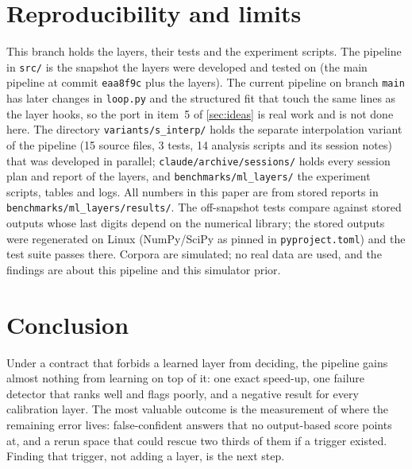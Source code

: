 \section{Reproducibility and limits}\label{sec:repro}
This branch holds the layers, their tests and the experiment scripts. The pipeline in \texttt{src/} is the snapshot the layers were developed and tested on (the main pipeline at commit \texttt{eaa8f9c} plus the layers). The current pipeline
on branch \texttt{main} has later changes in \texttt{loop.py} and the structured fit that touch the same lines as the layer hooks, so the port in item~5 of \cref{sec:ideas} is real work and is not done here. The directory \texttt{variants/s\_interp/} holds the separate interpolation variant of the pipeline (15 source files, 3 tests, 14 analysis scripts and its session notes) that was developed in parallel; \texttt{claude/archive/sessions/} holds every session plan and report of the layers, and \texttt{benchmarks/ml\_layers/} the experiment scripts, tables and logs. All
numbers in this paper are from stored reports in \texttt{benchmarks/ml\_layers/results/}. The off-snapshot tests compare against stored outputs whose last digits depend on the numerical library;
the stored outputs were regenerated on Linux (NumPy/SciPy as pinned in \texttt{pyproject.toml}) and the test suite passes there. Corpora are simulated; no real data are used, and the findings are about this pipeline and this simulator prior.

\section{Conclusion}\label{sec:conclusion}
Under a contract that forbids a learned layer from deciding, the pipeline gains almost nothing from learning on top of it: one exact speed-up, one failure detector that ranks well and flags poorly, and a negative result for every
calibration layer. The most valuable outcome is the measurement of where the remaining error lives: false-confident answers that no output-based score points at, and a rerun space that could rescue two thirds of them if a trigger existed.
Finding that trigger, not adding a layer, is the next step.

\appendix






